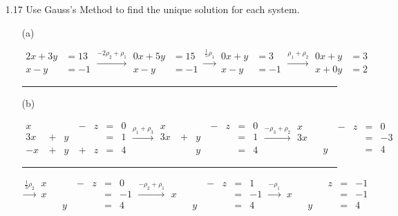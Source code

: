 \documentclass{article}
\begin{document}
\begin{enumerate}
\item[1.17] Use Gauss's Method to find the unique solution for each system.
\begin{enumerate}

\hrule

\item[(a)]

$\begin{aligned}
2x+3y&=13\\
x-y&=-1
\end{aligned}
\overset{-2\rho_2+\rho_1}{\longrightarrow}
\begin{aligned}
0x+5y&=15\\
x-y&=-1
\end{aligned}
\overset{\frac{1}{5}\rho_1}{\longrightarrow}
\begin{aligned}
0x+y&=3\\
x-y&=-1
\end{aligned}
\overset{\rho_1+\rho_2}{\longrightarrow}
\begin{aligned}
0x+y&=3\\
x+0y&=2
\end{aligned}$

\hrule

\item[(b)]

$\begin{aligned}
x&&&\ -&z&=&0\\
3x&\ +&y&&&=&1\\
-x&\ +&y&\ +&z&=&4
\end{aligned}
\overset{\rho_1+\rho_3}{\longrightarrow}
\begin{aligned}
x&&&\ -&z&=&0\\
3x&\ +&y&&&=&1\\
&&y&&&=&4
\end{aligned}
\overset{-\rho_3+\rho_2}{\longrightarrow}
\begin{aligned}
x&&&\ -&z&=&0\\
3x&&&&&=&-3\\
&&y&&&=&4
\end{aligned}$

\hrule

$\overset{\frac{1}{3}\rho_2}{\longrightarrow}
\begin{aligned}
x&&&\ -&z&=&0\\
x&&&&&=&-1\\
&&y&&&=&4
\end{aligned}
\overset{-\rho_2+\rho_1}{\longrightarrow}
\begin{aligned}
&&&\ -&z&=&1\\
x&&&&&=&-1\\
&&y&&&=&4
\end{aligned}
\overset{-\rho_1}{\longrightarrow}
\begin{aligned}
&&&&z&=&-1\\
x&&&&&=&-1\\
&&y&&&=&4
\end{aligned}$


\end{enumerate}
\end{enumerate}
\end{document}
